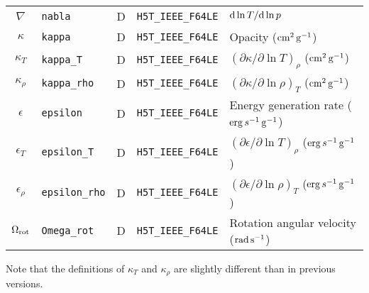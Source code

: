 \documentclass{article}
\newcommand{\diff}{\ensuremath{{\rm d}}}
\newcommand{\cm}{\ensuremath{{\rm cm}}}
\newcommand{\gram}{\ensuremath{{\rm g}}}
\newcommand{\second}{\ensuremath{{\rm s}}}
\newcommand{\erg}{\ensuremath{{\rm erg}}}
\begin{document}
\begin{table}[h!]
\begin{tabular}{|c|l|c|l|l|}
$\nabla$          & \texttt{nabla}        & D & \texttt{H5T\_IEEE\_F64LE} & $\diff \ln T/\diff \ln p$ \\
$\kappa$          & \texttt{kappa}       & D &  \texttt{H5T\_IEEE\_F64LE} & Opacity ($\cm^{2}\,\gram^{-1}$) \\
$\kappa_{T}$      & \texttt{kappa\_T}     & D &  \texttt{H5T\_IEEE\_F64LE} & $(\partial \kappa/\partial \ln T)_{\rho}$ ($\cm^{2}\,\gram^{-1}$) \\
$\kappa_{\rho}$   & \texttt{kappa\_rho}   & D &  \texttt{H5T\_IEEE\_F64LE} & $(\partial \kappa/\partial \ln \rho)_{T}$ ($\cm^{2}\,\gram^{-1}$) \\
$\epsilon$        & \texttt{epsilon}      & D &  \texttt{H5T\_IEEE\_F64LE} & Energy generation rate ($\erg\,s^{-1}\,\gram^{-1}$) \\
$\epsilon_{T}$    & \texttt{epsilon\_T}   & D &  \texttt{H5T\_IEEE\_F64LE} & $(\partial \epsilon/\partial \ln T)_{\rho}$ ($\erg\,s^{-1}\,\gram^{-1}$) \\
$\epsilon_{\rho}$ & \texttt{epsilon\_rho} & D &  \texttt{H5T\_IEEE\_F64LE} & $(\partial \epsilon/\partial \ln \rho)_{T}$ ($\erg\,s^{-1}\,\gram^{-1}$) \\
$\Omega_{\rm rot}$ & \texttt{Omega\_rot}   & D & \texttt{H5T\_IEEE\_F64LE} & Rotation angular velocity (${\rm rad}\,\second^{-1}$) \\  \hline
\end{tabular}
\end{table}

Note that the definitions of $\kappa_{T}$ and $\kappa_{\rho}$ are
slightly different than in previous versions.
\end{document}
